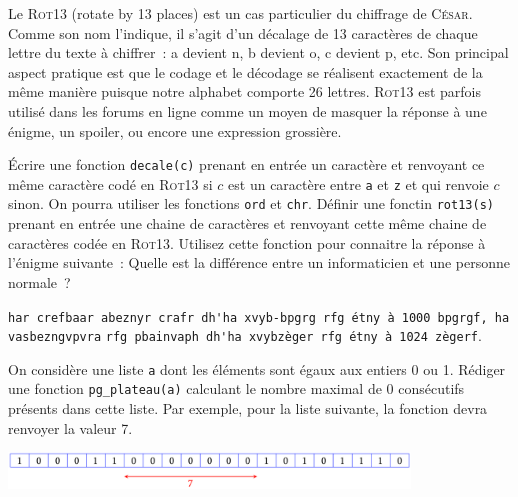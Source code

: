 \documentclass{magnolia}
\begin{document}

Le \textsc{Rot13} (rotate by 13 places) est un cas particulier du chiffrage de \textsc{César}.
Comme son nom l'indique, il s'agit d'un décalage de 13 caractères de chaque lettre du texte à
chiffrer~: a devient n, b devient o, c devient p, etc. Son principal aspect pratique est que
le codage et le décodage se réalisent exactement de la même manière puisque notre
alphabet comporte 26 lettres. \textsc{Rot13} est parfois utilisé dans les forums en ligne
comme un moyen de masquer la réponse à une énigme, un spoiler, ou encore une expression
grossière.
\begin{questions}
\question Écrire une fonction \verb!decale(c)! prenant en entrée un caractère et renvoyant
  ce même caractère codé en \textsc{Rot13} si $c$ est un caractère entre \verb!a! et \verb!z!
  et qui renvoie $c$ sinon. On pourra utiliser les fonctions \verb!ord! et \verb!chr!.
\question Définir une fonctin \verb!rot13(s)! prenant en entrée une chaine de caractères et
  renvoyant cette même chaine de caractères codée en \textsc{Rot13}.
\question Utilisez cette fonction pour connaitre la réponse à l'énigme suivante~: Quelle
  est la différence entre un informaticien et une personne normale~?
  \begin{center}
\verb!har crefbaar abeznyr crafr dh'ha xvyb-bpgrg rfg étny à 1000 bpgrgf, ha vasbezngvpvra!
\verb!rfg pbainvaph dh'ha xvybzèger rfg étny à 1024 zègerf!.
  \end{center}
\end{questions}

On considère une liste \verb!a! dont les éléments sont égaux aux entiers 0 ou 1. Rédiger une fonction
\verb!pg_plateau(a)! calculant le nombre maximal de 0 consécutifs présents dans cette liste. Par exemple,
pour la liste suivante, la fonction devra renvoyer la valeur 7.
\begin{center}
\includegraphics[width=0.8\textwidth]{../../Commun/Images/python-exo-plateau}\\
\end{center}
\end{document}
